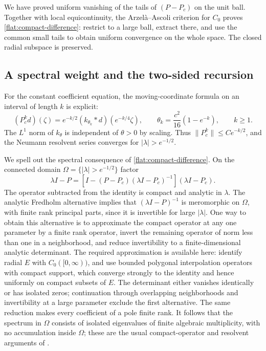 We have proved uniform vanishing of the tails of
$(P-P_c)$ on the unit ball. Together with local equicontinuity,
the Arzel\`a--Ascoli criterion for $C_0$ proves
\eqref{flat:compact-difference}: restrict to a large ball, extract
there, and use the common small tails to obtain uniform convergence
on the whole space. The closed radial subspace is preserved.

\subsection{A spectral weight and the two-sided recursion}

For the constant coefficient equation, the moving-coordinate formula
on an interval of length $k$ is explicit:
\begin{equation}\label{flat:constant-powers}
 (P_c^kd)(\zeta)
 =e^{-k/2}(k_{\theta_k}*d)(e^{-k/4}\zeta),
 \qquad
 \theta_k=\frac{c^2}{16}(1-e^{-k}),\qquad k\ge1.
\end{equation}
The $L^1$ norm of $k_\theta$ is independent of $\theta>0$ by
scaling. Thus $\|P_c^k\|\le Ce^{-k/2}$, and the Neumann resolvent
series converges for $|\lambda|>e^{-1/2}$.

We spell out the spectral consequence of
\eqref{flat:compact-difference}. On the connected domain
$\Omega=\{|\lambda|>e^{-1/2}\}$ factor
\[
 \lambda I-P
 =\left[I-(P-P_c)(\lambda I-P_c)^{-1}\right]
                         (\lambda I-P_c).
\]
The operator subtracted from the identity is compact and analytic
in $\lambda$. The analytic Fredholm alternative implies that
$(\lambda I-P)^{-1}$ is meromorphic on $\Omega$, with finite rank
principal parts, since it is invertible for large $|\lambda|$.
One way to obtain this alternative is to approximate the compact
operator at any one parameter by a finite rank operator, invert the
remaining operator of norm less than one in a neighborhood, and
reduce invertibility to a finite-dimensional analytic determinant.
The required approximation is available here: identify radial $E$
with $C_0([0,\infty))$, and use bounded polygonal interpolation
operators with compact support, which converge strongly to the
identity and hence uniformly on compact subsets of $E$.
The determinant either vanishes identically or has isolated zeros;
continuation through overlapping neighborhoods and invertibility
at a large parameter exclude the first alternative. The same
reduction makes every coefficient of a pole finite rank.
It follows that the spectrum in $\Omega$ consists of isolated
eigenvalues of finite algebraic multiplicity, with no accumulation
inside $\Omega$; these are the usual compact-operator and resolvent
arguments of \cite[Chapter~VII, Section~1.3, and the supplementary notes]{Kato1995}.

